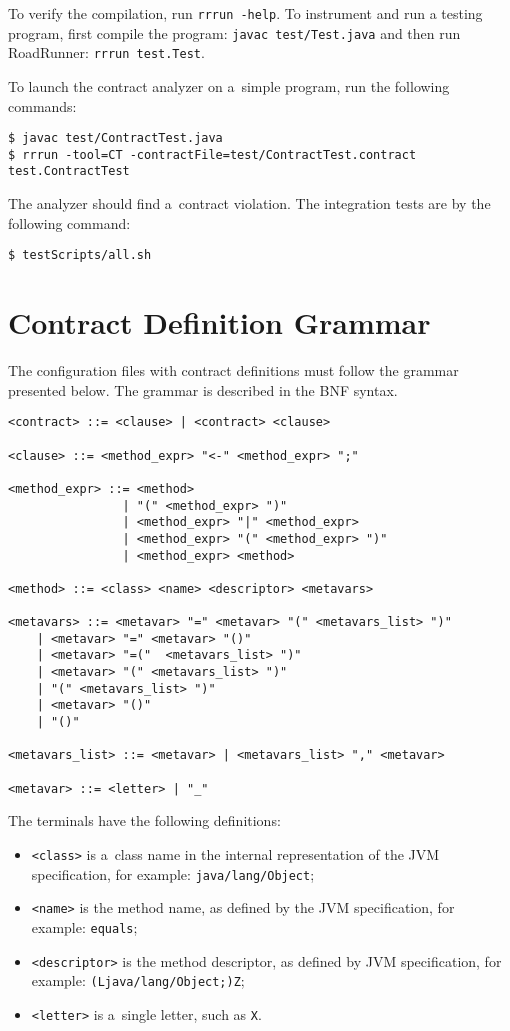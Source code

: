 To verify the compilation, run \texttt{rrrun -help}. To instrument and run a
testing program, first compile the program: \texttt{javac test/Test.java} and
then run RoadRunner: \texttt{rrrun test.Test}.

To launch the contract analyzer on a~simple program, run the following commands:
\begin{lstlisting}[frame=none]
$ javac test/ContractTest.java
$ rrrun -tool=CT -contractFile=test/ContractTest.contract test.ContractTest
\end{lstlisting}
The analyzer should find a~contract violation. The integration tests are by the
following command:
\begin{lstlisting}[frame=none]
$ testScripts/all.sh
\end{lstlisting}

\chapter{Contract Definition Grammar}
\label{appGrammar}

The configuration files with contract definitions must follow the grammar
presented below. The grammar is described in the BNF syntax.

\begin{lstlisting}
<contract> ::= <clause> | <contract> <clause>

<clause> ::= <method_expr> "<-" <method_expr> ";"

<method_expr> ::= <method>
                | "(" <method_expr> ")"
                | <method_expr> "|" <method_expr>
                | <method_expr> "(" <method_expr> ")"
                | <method_expr> <method>

<method> ::= <class> <name> <descriptor> <metavars>

<metavars> ::= <metavar> "=" <metavar> "(" <metavars_list> ")"
    | <metavar> "=" <metavar> "()" 
    | <metavar> "=("  <metavars_list> ")"
    | <metavar> "(" <metavars_list> ")"
    | "(" <metavars_list> ")"
    | <metavar> "()" 
    | "()"

<metavars_list> ::= <metavar> | <metavars_list> "," <metavar>

<metavar> ::= <letter> | "_"
\end{lstlisting}
The terminals have the following definitions:
\begin{itemize}
    \item \texttt{<class>} is a~class name in the internal representation of
        the JVM specification, for example: \texttt{java/lang/Object};
    \item \texttt{<name>} is the method name, as defined by the JVM
        specification, for example: \texttt{equals};
    \item \texttt{<descriptor>} is the method descriptor, as defined by JVM
        specification, for example: \texttt{(Ljava/lang/Object;)Z};
    \item \texttt{<letter>} is a~single letter, such as \texttt{X}.
\end{itemize}

